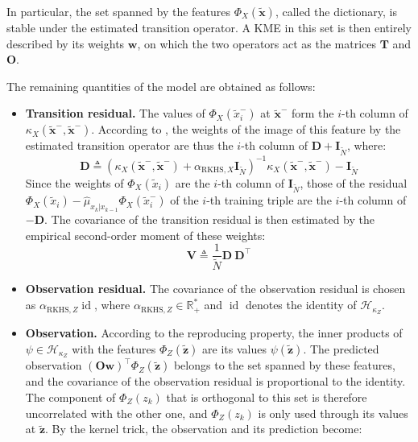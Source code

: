 In particular, the set spanned by the features $\Phi_X(\tilde{\mathbf{x}})$, called the dictionary, is stable under the estimated transition operator. A KME in this set is then entirely described by its weights $\mathbf{w}$, on which the two operators act as the matrices $\mathbf{T}$ and $\mathbf{O}$.

The remaining quantities of the model are obtained as follows:
\begin{itemize}
	\item\textbf{Transition residual.} The values of $\Phi_X\left(\tilde{x}_i^-\right)$ at $\tilde{\mathbf{x}}^-$ form the $i$-th column of $\kappa_X\left(\tilde{\mathbf{x}}^-,\tilde{\mathbf{x}}^-\right)$. According to , the weights of the image of this feature by the estimated transition operator are thus the $i$-th column of $\mathbf{D}+\mathbf{I}_{\tilde{N}}$, where:
	\begin{equation}
		\mathbf{D}\triangleq\left(\kappa_X\left(\tilde{\mathbf{x}}^-,\tilde{\mathbf{x}}^-\right)+\alpha_{\mathrm{RKHS},X}\mathbf{I}_{\tilde{N}}\right)^{-1}\kappa_X\left(\tilde{\mathbf{x}}^-,\tilde{\mathbf{x}}^-\right)-\mathbf{I}_{\tilde{N}}
	\end{equation}
	Since the weights of $\Phi_X(\tilde{x}_i)$ are the $i$-th column of $\mathbf{I}_{\tilde{N}}$, those of the residual $\Phi_X(\tilde{x}_i)-\hat{\mu}_{x_k|x_{k-1}}\Phi_X\left(\tilde{x}_i^-\right)$ of the $i$-th training triple are the $i$-th column of $-\mathbf{D}$. The covariance of the transition residual is then estimated by the empirical second-order moment of these weights:
	\begin{equation}
		\mathbf{V}\triangleq\frac{1}{\tilde{N}}\mathbf{D}\:\mathbf{D}^\top
	\end{equation}
	\item\textbf{Observation residual.} The covariance of the observation residual is chosen as $\alpha_{\mathrm{RKHS},Z}\operatorname{id}$, where $\alpha_{\mathrm{RKHS},Z}\in\mathbb{R}_+^*$ and $\operatorname{id}$ denotes the identity of $\mathcal{H}_{\kappa_Z}$.
	\item\textbf{Observation.} According to the reproducing property, the inner products of $\psi\in\mathcal{H}_{\kappa_Z}$ with the features $\Phi_Z(\tilde{\mathbf{z}})$ are its values $\psi(\tilde{\mathbf{z}})$. The predicted observation $(\mathbf{O}\mathbf{w})^\top\Phi_Z(\tilde{\mathbf{z}})$ belongs to the set spanned by these features, and the covariance of the observation residual is proportional to the identity. The component of $\Phi_Z(z_k)$ that is orthogonal to this set is therefore uncorrelated with the other one, and $\Phi_Z(z_k)$ is only used through its values at $\tilde{\mathbf{z}}$. By the kernel trick, the observation and its prediction become:

\end{itemize}
